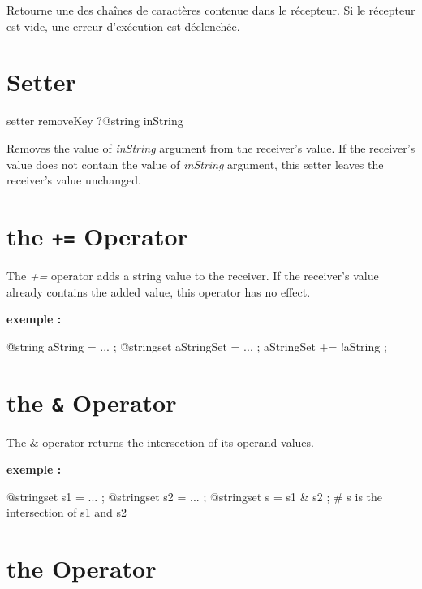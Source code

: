 Retourne une des chaînes de caractères contenue dans le récepteur. Si le récepteur est vide, une erreur d'exécution est déclenchée.




\section{Setter}


\begin{galgas}
setter removeKey ?@string inString
\end{galgas}


Removes the value of \emph{inString} argument from the receiver's value. If the receiver's value does not contain the value of \emph{inString} argument, this setter leaves the receiver's value unchanged.






\section{the \texttt{+=} Operator}

The \emph{+=} operator adds a string value to the receiver. If the receiver's value already contains the added value, this operator has no effect.

\textbf{exemple :}
\begin{galgas}
@string aString = ... ;
@stringset aStringSet = ... ;
aStringSet += !aString ;
\end{galgas}




\section{the \texttt{\&} Operator}

The \emph{$\&$} operator returns the intersection of its operand values.

\textbf{exemple :}
\begin{galgas}
@stringset s1 = ... ;
@stringset s2 = ... ;
@stringset s = s1 & s2 ; # s is the intersection of s1 and s2
\end{galgas}






\section{the \texttt{\textbar} Operator}

